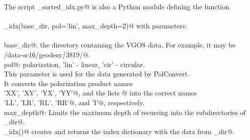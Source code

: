 \documentclass[letterpaper,twoside,12pt]{article}
\begin{document}
\noindent The script \verb@make_sorted_idx.py@ is also a Python module defining the function \\ \\
\verb@make_idx(base_dir, pol='lin', max_depth=2)@ with parameters: \\ \\
\verb@    base_dir@: the directory containing the VGOS data. For example, it may be \\
\verb@              /data-sc16/geodesy/3819/@. \\
\verb@    pol@: polarization, 'lin' - linear, 'cir' - circular. \\
    \indent \indent \indent This parameter is used for the data generated by PolConvert. \\
    \indent \indent \indent It converts the polarization product names\\
    \verb@          'XX', 'XY', 'YX', 'YY'@, and the lists \verb@['XX', 'YY']@ into the correct names \\
    \verb@          'LL', 'LR', 'RL', 'RR'@, and \verb@'I'@, respectively. \\
\verb@    max_depth@: Limits the maximum depth of recursing into the subdirectories of \verb@base_dir@. \\

\noindent \verb@make_idx()@ creates and returns the index dictionary with the data from \verb@base_dir@. \\
\end{document}
